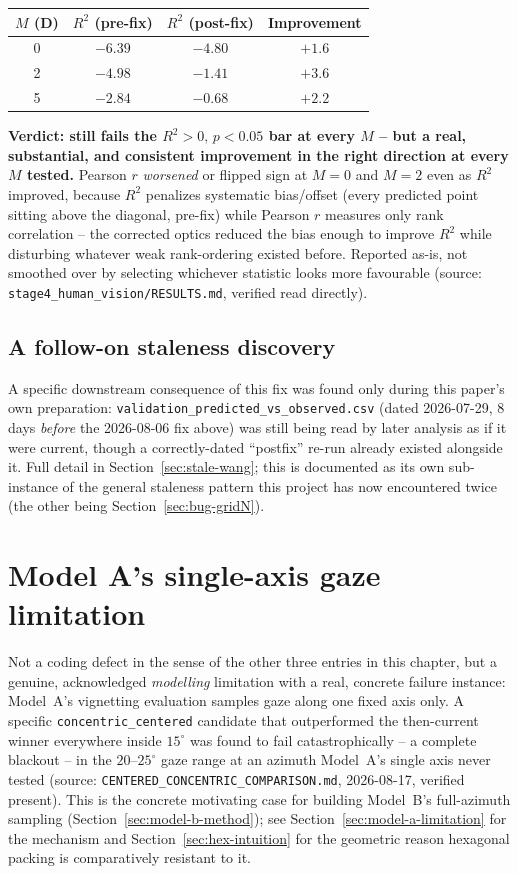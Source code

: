 \begin{center}
\begin{tabular}{cccc}
\toprule
$M$ (D) & $R^2$ (pre-fix) & $R^2$ (post-fix) & Improvement \\
\midrule
0 & $-6.39$ & $-4.80$ & $+1.6$ \\
2 & $-4.98$ & $-1.41$ & $+3.6$ \\
5 & $-2.84$ & $-0.68$ & $+2.2$ \\
\bottomrule
\end{tabular}
\end{center}
\textbf{Verdict: still fails the $R^2{>}0,\,p{<}0.05$ bar at every $M$ -- but a real,
substantial, and consistent improvement in the right direction at every $M$ tested.}
Pearson $r$ \emph{worsened} or flipped sign at $M=0$ and $M=2$ even as $R^2$ improved,
because $R^2$ penalizes systematic bias/offset (every predicted point sitting above the
diagonal, pre-fix) while Pearson $r$ measures only rank correlation -- the corrected
optics reduced the bias enough to improve $R^2$ while disturbing whatever weak
rank-ordering existed before. Reported as-is, not smoothed over by selecting whichever
statistic looks more favourable (source:
\texttt{stage4\_human\_vision/RESULTS.md}, verified read directly).

\subsection{A follow-on staleness discovery}
A specific downstream consequence of this fix was found only during this paper's own
preparation: \texttt{validation\_predicted\_vs\_observed.csv} (dated 2026-07-29,
8 days \emph{before} the 2026-08-06 fix above) was still being read by later analysis as
if it were current, though a correctly-dated ``postfix'' re-run already existed
alongside it. Full detail in Section~\ref{sec:stale-wang}; this is documented as its own
sub-instance of the general staleness pattern this project has now encountered twice
(the other being Section~\ref{sec:bug-gridN}).

\section{Model A's single-axis gaze limitation}
\label{sec:bug-single-axis}
Not a coding defect in the sense of the other three entries in this chapter, but a
genuine, acknowledged \emph{modelling} limitation with a real, concrete failure
instance: Model~A's vignetting evaluation samples gaze along one fixed axis only. A
specific \texttt{concentric\_centered} candidate that outperformed the then-current
winner everywhere inside $15^\circ$ was found to fail catastrophically -- a complete
blackout -- in the $20$--$25^\circ$ gaze range at an azimuth Model~A's single axis never
tested (source: \texttt{CENTERED\_CONCENTRIC\_COMPARISON.md}, 2026-08-17, verified
present). This is the concrete motivating case for building Model~B's full-azimuth
sampling (Section~\ref{sec:model-b-method}); see Section~\ref{sec:model-a-limitation}
for the mechanism and Section~\ref{sec:hex-intuition} for the geometric reason
hexagonal packing is comparatively resistant to it.

